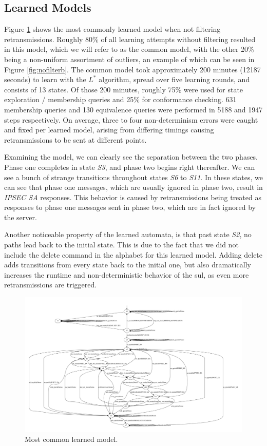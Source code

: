 \subsection{Learned Models} \label{subsec:models}
Figure \ref{fig:nofiltera} shows the most commonly learned model when not filtering retransmissions. Roughly 80\% of all learning attempts without filtering resulted in this model, which we will refer to as the common model, with the other 20\% being a non-uniform assortment of outliers, an example of which can be seen in Figure \ref{fig:nofilterb}. The common model took approximately 200 minutes (12187 seconds) to learn with the $L^*$ algorithm, spread over five learning rounds, and consists of 13 states. Of those 200 minutes, roughly 75\% were used for state exploration / membership queries and 25\% for conformance checking. 631 membership queries and 130 equivalence queries were performed in 5188 and 1947 steps respectively. On average, three to four non-determinism errors were caught and fixed per learned model, arising from differing timings causing retransmissions to be sent at different points. 

Examining the model, we can clearly see the separation between the two phases. Phase one completes in state \emph{S3}, and phase two begins right thereafter. We can see a bunch of strange transitions throughout states \emph{S6} to \emph{S11}. In these states, we can see that phase one messages, which are usually ignored in phase two, result in \emph{IPSEC SA} responses. This behavior is caused by retransmissions being treated as responses to phase one messages sent in phase two, which are in fact ignored by the server. 

Another noticeable property of the learned automata, is that past state \emph{S2}, no paths lead back to the initial state. This is due to the fact that we did not include the delete command in the alphabet for this learned model. Adding delete adds transitions from every state back to the initial one, but also dramatically increases the runtime and non-deterministic behavior of the \ac{sul}, as even more retransmissions are triggered.

\begin{figure}[h]
	\centering
	\includegraphics[width=\linewidth]{images/NoFilterA}
	\caption{Most common learned model.}
	\label{fig:nofiltera}
\end{figure}


